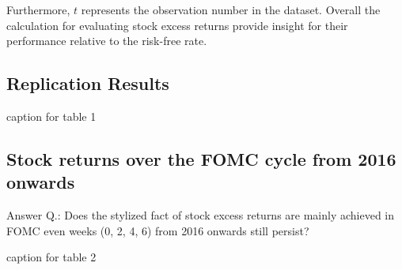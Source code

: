 Furthermore, \(t\) represents the observation number in the dataset. 
Overall the calculation for evaluating stock excess returns provide insight for their 
performance relative to the risk-free rate.

\subsection{Replication Results}

\begin{table}[h]
\begin{center}
\begin{adjustbox}{width=1\textwidth}


\end{tabular}
}

\end{adjustbox}
\caption{\label{table_1} caption for table 1}
\end{center}
\end{table}


\subsection{Stock returns over the FOMC cycle from 2016 onwards}

Answer Q.: Does the stylized fact of stock excess returns are mainly achieved in FOMC even weeks (0,  2,  4,  6) from 2016 onwards still persist?

\begin{table}[h]
\begin{center}
\begin{adjustbox}{width=1\textwidth}

\end{tabular}
}
\end{adjustbox}
\caption{\label{table_2} caption for table 2}
\end{center}
\end{table}

\pagebreak



